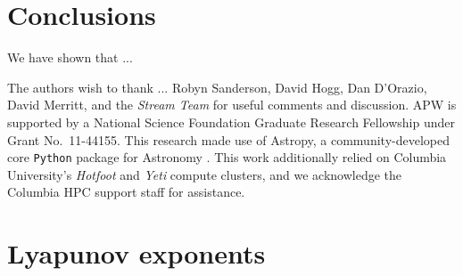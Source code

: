 \documentclass[letterpaper,12pt,preprint]{aastex}
\newcommand{\ident}{\mathbb{1}}
\begin{document}
\section{Conclusions}\label{sec:conclusions}
We have shown that ...

\acknowledgements
The authors wish to thank ... Robyn Sanderson, David Hogg, Dan D'Orazio, David Merritt, and the \emph{Stream Team} for useful comments and discussion.
APW is supported by a National Science Foundation Graduate Research Fellowship under Grant No.\ 11-44155. 
This research made use of Astropy, a community-developed core \texttt{Python} package for Astronomy \citep{astropy13}.
This work additionally relied on Columbia University's \emph{Hotfoot} and \emph{Yeti} compute clusters, and we acknowledge the Columbia HPC support staff for assistance.




\appendix
\section{Lyapunov exponents} \label{sec:lyapapdx}

\end{document}
